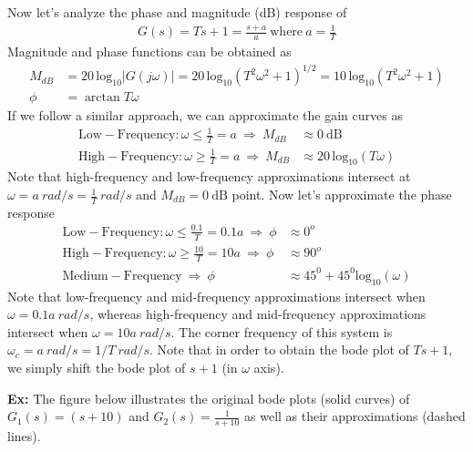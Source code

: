 \documentclass[twoside]{article}
\begin{document}
\vspace{6 pt}

Now let's analyze the phase and magnitude (dB) response of 
%
\begin{align*}
  G(s) = T s + 1 = \frac{s + a}{a} \ \mathrm{where} \ a = \frac{1}{T}
\end{align*}
%
Magnitude and phase functions can be obtained as
\begin{align*}
  M_{dB}  &= 20 \, \mathrm{log}_{10} | G( j \omega) | = 20 \, \mathrm{log}_{10} \left( T^2 \omega^2 + 1 \right)^{1/2} = 10 \, \mathrm{log}_{10} \left( T^2 \omega^2 + 1 \right)
  \\
  \phi &= \arctan T \omega                                    
\end{align*}
%
If we follow a similar approach, we can approximate the gain curves as
%
\begin{align*}
  \mathrm{Low-Frequency}: \omega \leq \frac{1}{T} = a  \ \Rightarrow \ M_{dB}  &\approx 0 \ \mathrm{dB} \\
  \mathrm{High-Frequency}: \omega \geq \frac{1}{T} = a \ \Rightarrow \ M_{dB}  &\approx 20 \, \mathrm{log}_{10} ( T \omega )
\end{align*}
%
Note that high-frequency and low-frequency approximations intersect at
$\omega = a \ rad/s = \frac{1}{T} \ rad/s$ and $M_{dB} = 0 \ \mathrm{dB}$ point. Now 
let's approximate the phase response
%
\begin{align*}
  \mathrm{Low-Frequency}: \omega \leq \frac{0.1}{T} = 0.1 a \ \Rightarrow \ \phi  &\approx 0^o  \\
  \mathrm{High-Frequency}: \omega \geq \frac{10}{T} = 10 a  \ \Rightarrow \ \phi &\approx 90^o \\
  \mathrm{Medium-Frequency} \ \Rightarrow \ \phi & \approx 45^0 + 45^0 \mathrm{log}_{10} ( \omega)
\end{align*}
%
Note that low-frequency and mid-frequency approximations intersect
when $\omega = 0.1 a \ rad/s$,
whereas high-frequency and mid-frequency approximations intersect when
$\omega = 10 a \ rad/s$.
The corner frequency of this system is $\omega_c = a \ rad/s = 1/T \
rad/s$. Note that in order to obtain the bode plot of $T s + 1$, we
simply shift the bode plot of $s + 1$ (in $\omega$ axis). 

\vspace{6pt}

\textbf{Ex:} The figure below
illustrates the original bode plots (solid curves) of $G_1(s) = (s+10)$ and $G_2(s) = \frac{1}{s+10}$ as well as
their approximations (dashed lines). 
\end{document}
